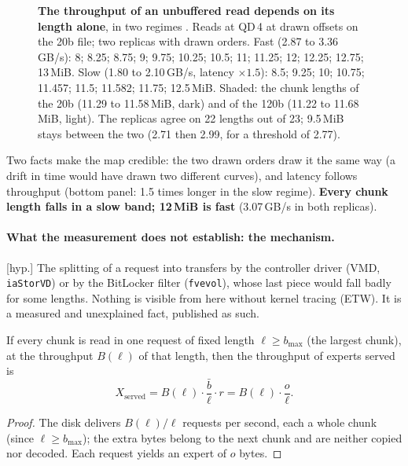 \begin{figure}[ht]
\centering
\GrapheChmLongueurs
\caption[The discovery: throughput against read length]{\textbf{The throughput of an unbuffered read depends on its length alone}, in two regimes \mes. Reads at QD\,4 at drawn offsets on the 20b file; two replicas with drawn orders. Fast (2.87 to 3.36\,GB/s): 8; 8.25; 8.75; 9; 9.75; 10.25; 10.5; 11; 11.25; 12; 12.25; 12.75; 13\,MiB. Slow (1.80 to 2.10\,GB/s, latency $\times 1.5$): 8.5; 9.25; 10; 10.75; 11.457; 11.5; 11.582; 11.75; 12.5\,MiB. Shaded: the chunk lengths of the 20b (11.29 to 11.58\,MiB, dark) and of the 120b (11.22 to 11.68\,MiB, light). The replicas agree on 22 lengths out of 23; 9.5\,MiB stays between the two (2.71 then 2.99, for a threshold of 2.77).}
\label{fig:t2c-longueurs}
\end{figure}

Two facts make the map credible: the two drawn orders draw it the same way (a drift in time would have drawn two different curves), and latency follows throughput (bottom panel: 1.5 times longer in the slow regime). \textbf{Every chunk length falls in a slow band; 12\,MiB is fast} (3.07\,GB/s in both replicas).

\paragraph{What the measurement does not establish: the mechanism.} [hyp.] The splitting of a request into transfers by the controller driver (VMD, \texttt{iaStorVD}) or by the BitLocker filter (\texttt{fvevol}), whose last piece would fall badly for some lengths. Nothing is visible from here without kernel tracing (ETW). It is a measured and unexplained fact, published as such.

\begin{proposition}\label{prop:t2c-longueur-fixe}
If every chunk is read in one request of fixed length $\ell \ge b_{\max}$ (the largest chunk), at the throughput $B(\ell)$ of that length, then the throughput of experts served is
\[
X_{\mathrm{served}} = B(\ell) \cdot \frac{\bar b}{\ell} \cdot r = B(\ell) \cdot \frac{o}{\ell}.
\]
\end{proposition}

\begin{proof}
The disk delivers $B(\ell)/\ell$ requests per second, each a whole chunk (since $\ell \ge b_{\max}$); the extra bytes belong to the next chunk and are neither copied nor decoded. Each request yields an expert of $o$ bytes.
\end{proof}

